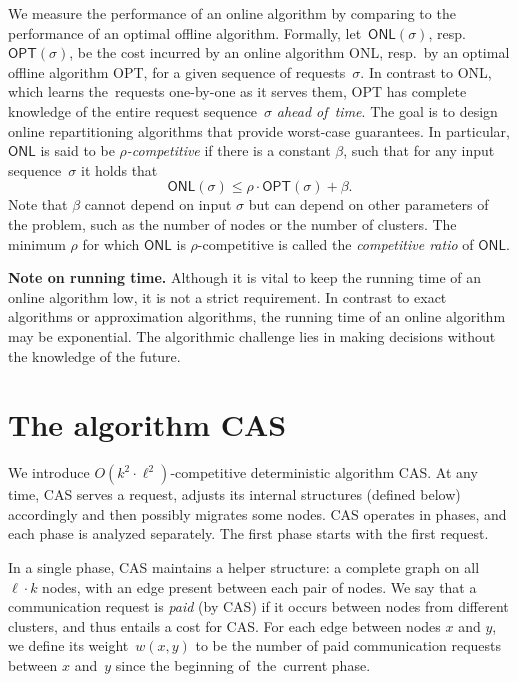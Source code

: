 \documentclass[a4paper,anonymous,USenglish]{lipics-v2019}
\newcommand{\OPT}{\textsf{OPT}\xspace}
\newcommand{\ONL}{\textsf{ONL}\xspace}
\newcommand{\DET}{\textsf{CAS}\xspace}
\begin{document}
We measure
the performance of an online algorithm by comparing to the performance of an optimal offline
algorithm. Formally, let~$\ONL(\sigma)$, resp.~$\OPT(\sigma)$, be the cost
incurred by an online algorithm \ONL, resp.~by an optimal offline
algorithm \OPT, for a given sequence of requests~$\sigma$. In contrast to \ONL, which learns the~requests one-by-one as
it serves them, \OPT has complete knowledge of the entire request
sequence~$\sigma$ \emph{ahead of~time}. The goal is to design online repartitioning
algorithms that provide worst-case guarantees. In particular, $\ONL$ is said
to be \emph{$\rho$-competitive} if there is a constant $\beta$, such that for any
input sequence~$\sigma$ it holds that
\[
	\ONL(\sigma) \leq \rho \cdot \OPT(\sigma) + \beta.
\]
Note that $\beta$ cannot depend on input $\sigma$ but can depend on other
parameters of the problem, such as the number of nodes or the number of clusters.
The minimum $\rho$ for which $\ONL$ is $\rho$-competitive is called the 
\emph{competitive ratio} of $\ONL$. 

\noindent
\textbf{Note on running time.}
Although it is vital to keep the running time of an online algorithm low, it is
not a strict requirement. In contrast to exact algorithms or approximation
algorithms, the running time of an online algorithm may be exponential.
The algorithmic challenge lies in making decisions without the knowledge of the
future.


\section{The algorithm CAS}
\label{sec:upper}

We introduce $O(k^2
\cdot \ell^2)$-competitive deterministic algorithm \DET. At any time, \DET
serves a request, adjusts its internal structures (defined below)
accordingly and then possibly migrates some nodes. \DET operates in phases, and each
phase is analyzed separately. The first phase starts with the first request.

In a single phase, \DET maintains a helper structure: a complete graph on all
$\ell \cdot k$ nodes, with an edge present between each pair of nodes. We say
that a communication request is \emph{paid} (by \DET) if it occurs between
nodes from different clusters, and thus entails a cost for \DET. For each edge
between nodes $x$ and $y$, we define its weight~$w(x,y)$ to be the number of
paid communication requests between $x$ and~$y$ since the beginning of~the~current phase.
\end{document}
